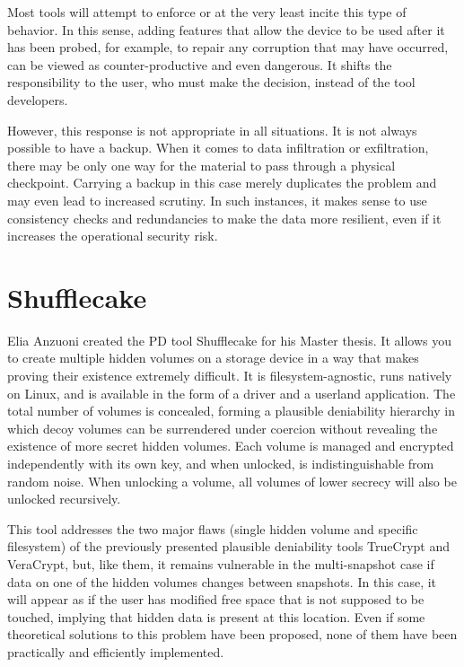 \documentclass[a4paper,11pt,oneside]{report}
\begin{document}
Most tools will attempt to enforce or at the very least incite this type of behavior. In this sense, adding features that allow the device to be used after it has been probed, for example, to repair any corruption that may have occurred, can be viewed as counter-productive and even dangerous. It shifts the responsibility to the user, who must make the decision, instead of the tool developers.

However, this response is not appropriate in all situations. It is not always possible to have a backup. When it comes to data infiltration or exfiltration, there may be only one way for the material to pass through a physical checkpoint. Carrying a backup in this case merely duplicates the problem and may even lead to increased scrutiny. In such instances, it makes sense to use consistency checks and redundancies to make the data more resilient, even if it increases the operational security risk.

\let\clearpage\relax

\chapter{Shufflecake}

Elia Anzuoni created the PD tool Shufflecake for his Master thesis. It allows you to create multiple hidden volumes on a storage device in a way that makes proving their existence extremely difficult. It is filesystem-agnostic, runs natively on Linux, and is available in the form of a driver and a userland application. The total number of volumes is concealed, forming a plausible deniability hierarchy in which decoy volumes can be surrendered under coercion without revealing the existence of more secret hidden volumes. Each volume is managed and encrypted independently with its own key, and when unlocked, is indistinguishable from random noise. When unlocking a volume, all volumes of lower secrecy will also be unlocked recursively.

This tool addresses the two major flaws (single hidden volume and specific filesystem) of the previously presented plausible deniability tools TrueCrypt and VeraCrypt, but, like them, it remains vulnerable in the multi-snapshot case if data on one of the hidden volumes changes between snapshots. In this case, it will appear as if the user has modified free space that is not supposed to be touched, implying that hidden data is present at this location. Even if some theoretical solutions to this problem have been proposed, none of them have been practically and efficiently implemented.
\end{document}
